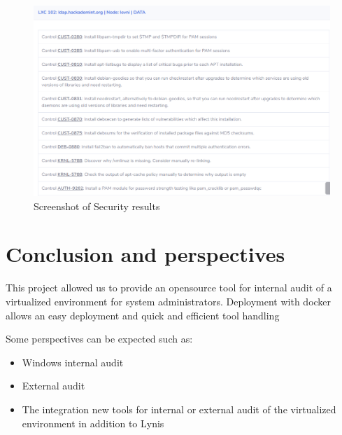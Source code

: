 \begin{figure}[!h]
  \centering
  \includegraphics[width=1.05\textwidth]{images/flask-application-4.png}
  \caption{Screenshot of Security results}
  \label{CTView3}
\end{figure}

\pagebreak

\section{Conclusion and perspectives}


This project allowed us to provide an opensource tool for internal audit of a virtualized environment for system administrators.
Deployment with docker allows an easy deployment and quick and efficient tool handling

Some perspectives can be expected such as:
\begin{itemize}
  \item{Windows internal audit}
  \item{External audit}
  \item{The integration new tools for internal or external audit of the virtualized environment in addition to Lynis}
\end{itemize}



